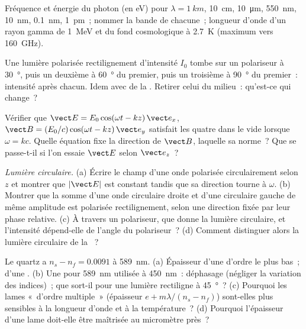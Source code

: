 \begin{exercise}[$\star$]\label{exo:b2:plane-waves-polarization:2}
Fréquence et énergie du photon (en eV) pour $\lambda = \qty{1}{km}$, \qty{10}{cm},
\qty{10}{\micro m}, \qty{550}{nm}, \qty{10}{nm}, \qty{0.1}{nm}, \qty{1}{pm}~; nommer la
bande de chacune~; longueur d'onde d'un rayon gamma de \qty{1}{MeV} et du
fond cosmologique à \qty{2.7}{K} (maximum vers \qty{160}{GHz}).
\end{exercise}

\begin{exercise}[$\star$]\label{exo:b2:plane-waves-polarization:3}
Une lumière polarisée rectilignement d'intensité $I_0$ tombe sur un polariseur à
\qty{30}{\degree}, puis un deuxième à \qty{60}{\degree} du premier, puis un
troisième à \qty{90}{\degree} du premier~: intensité après chacun. Idem avec de
la . Retirer celui du milieu~: qu'est-ce qui change~?
\end{exercise}

\begin{exercise}[$\star$]\label{exo:b2:plane-waves-polarization:4}
Vérifier que $\vect E = E_0\cos(\omega t - kz)\,\vect e_x$, $\vect B = (E_0/c)\cos(\omega t
- kz)\,\vect e_y$ satisfait les quatre  dans le vide lorsque $\omega =
kc$. Quelle équation fixe la direction de $\vect B$, laquelle sa
norme~? Que se passe-t-il si l'on essaie $\vect E$ selon $\vect e_z$~?
\end{exercise}

\begin{exercise}[$\star\star$]\label{exo:b2:plane-waves-polarization:5}
\emph{Lumière circulaire.} (a) Écrire le champ d'une onde polarisée
circulairement selon $z$ et montrer que $|\vect E|$ est constant tandis que sa direction
tourne à $\omega$. (b) Montrer que la somme d'une onde circulaire droite et d'une circulaire
gauche de même amplitude est polarisée rectilignement, selon une direction fixée par
leur phase relative. (c) À travers un polariseur, que donne la lumière circulaire,
et l'intensité dépend-elle de l'angle du polariseur~? (d) Comment
distinguer alors la lumière circulaire de la ~?
\end{exercise}

\begin{exercise}[$\star\star$]\label{exo:b2:plane-waves-polarization:6}
Le quartz a $n_s - n_f = 0.0091$ à \qty{589}{nm}. (a) Épaisseur d'une
 d'ordre le plus bas~; d'une . (b) Une
 pour \qty{589}{nm} utilisée à \qty{450}{nm}~: déphasage
(négliger la variation des indices)~; que sort-il pour une lumière rectiligne
à \qty{45}{\degree}~? (c) Pourquoi les lames «~d'ordre multiple~» (épaisseur $e +
m\lambda/(n_s - n_f)$) sont-elles plus sensibles à la longueur d'onde et à la température~? (d) Pourquoi
l'épaisseur d'une lame doit-elle être maîtrisée au micromètre près~?
\end{exercise}

